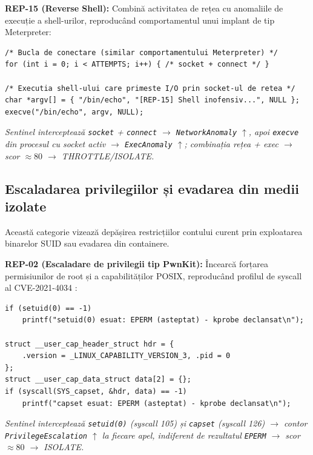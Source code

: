 \par \textbf{REP-15 (Reverse Shell):} Combină activitatea de rețea cu anomaliile de execuție a shell-urilor, reproducând comportamentul unui implant de tip Meterpreter:

\begin{lstlisting}[style=cstyle,caption={REP-15: Conexiune C2 urmată de instanțierea unui shell}]
/* Bucla de conectare (similar comportamentului Meterpreter) */
for (int i = 0; i < ATTEMPTS; i++) { /* socket + connect */ }

/* Executia shell-ului care primeste I/O prin socket-ul de retea */
char *argv[] = { "/bin/echo", "[REP-15] Shell inofensiv...", NULL };
execve("/bin/echo", argv, NULL);
\end{lstlisting}
\par\textit{Sentinel interceptează \texttt{socket} + \texttt{connect} $\rightarrow$ \texttt{NetworkAnomaly} $\uparrow$, apoi \texttt{execve} din procesul cu socket activ $\rightarrow$ \texttt{ExecAnomaly} $\uparrow$; combinația rețea + exec $\rightarrow$ scor $\approx 80$ $\rightarrow$ THROTTLE/ISOLATE.}

\subsection{Escaladarea privilegiilor și evadarea din medii izolate}
\label{subsec:attack_privesc}

\par Această categorie vizează depășirea restricțiilor contului curent prin exploatarea binarelor SUID sau evadarea din containere.

\par \textbf{REP-02 (Escaladare de privilegii tip PwnKit):} Încearcă forțarea permisiunilor de root și a capabilităților POSIX, reproducând profilul de syscall al CVE-2021-4034 \cite{PwnKit2022}:

\begin{lstlisting}[style=cstyle,caption={REP-02: Tentative eșuate dar interceptate de setuid și capset}]
if (setuid(0) == -1)
    printf("setuid(0) esuat: EPERM (asteptat) - kprobe declansat\n");

struct __user_cap_header_struct hdr = {
    .version = _LINUX_CAPABILITY_VERSION_3, .pid = 0
};
struct __user_cap_data_struct data[2] = {};
if (syscall(SYS_capset, &hdr, data) == -1)
    printf("capset esuat: EPERM (asteptat) - kprobe declansat\n");
\end{lstlisting}
\par\textit{Sentinel interceptează \texttt{setuid(0)} (syscall 105) și \texttt{capset} (syscall 126) $\rightarrow$ contor \texttt{PrivilegeEscalation} $\uparrow$ la fiecare apel, indiferent de rezultatul \texttt{EPERM} $\rightarrow$ scor $\approx 80$ $\rightarrow$ ISOLATE.}

